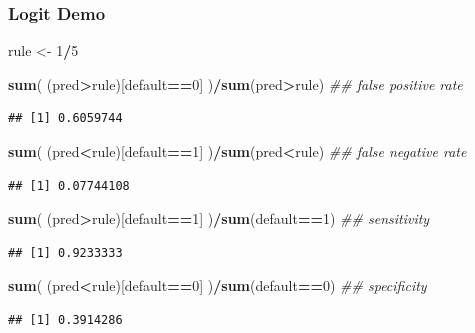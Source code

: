 \documentclass[
  shownotes,
  xcolor={svgnames},
  hyperref={colorlinks,citecolor=DarkBlue,linkcolor=DarkRed,urlcolor=DarkBlue}
  , aspectratio=169]{beamer}
\newenvironment{Shaded}{\begin{snugshade}}{\end{snugshade}}
\newcommand{\CommentTok}[1]{\textcolor[rgb]{0.56,0.35,0.01}{\textit{#1}}}
\newcommand{\DecValTok}[1]{\textcolor[rgb]{0.00,0.00,0.81}{#1}}
\newcommand{\KeywordTok}[1]{\textcolor[rgb]{0.13,0.29,0.53}{\textbf{#1}}}
\newcommand{\NormalTok}[1]{#1}
\newcommand{\OperatorTok}[1]{\textcolor[rgb]{0.81,0.36,0.00}{\textbf{#1}}}
\newcommand{\StringTok}[1]{\textcolor[rgb]{0.31,0.60,0.02}{#1}}
\begin{document}
\begin{frame}[fragile]
\frametitle{Logit Demo}

\begin{Shaded}
\begin{Highlighting}[]
\NormalTok{rule \textless{}{-}}\StringTok{ }\DecValTok{1}\OperatorTok{/}\DecValTok{5} 

\KeywordTok{sum}\NormalTok{( (pred}\OperatorTok{\textgreater{}}\NormalTok{rule)[default}\OperatorTok{==}\DecValTok{0}\NormalTok{] )}\OperatorTok{/}\KeywordTok{sum}\NormalTok{(pred}\OperatorTok{\textgreater{}}\NormalTok{rule) }\CommentTok{\#\# false positive rate}
\end{Highlighting}
\end{Shaded}

\begin{verbatim}
## [1] 0.6059744
\end{verbatim}

\begin{Shaded}
\begin{Highlighting}[]
\KeywordTok{sum}\NormalTok{( (pred}\OperatorTok{\textless{}}\NormalTok{rule)[default}\OperatorTok{==}\DecValTok{1}\NormalTok{] )}\OperatorTok{/}\KeywordTok{sum}\NormalTok{(pred}\OperatorTok{\textless{}}\NormalTok{rule) }\CommentTok{\#\# false negative rate}
\end{Highlighting}
\end{Shaded}

\begin{verbatim}
## [1] 0.07744108
\end{verbatim}

\begin{Shaded}
\begin{Highlighting}[]
\KeywordTok{sum}\NormalTok{( (pred}\OperatorTok{\textgreater{}}\NormalTok{rule)[default}\OperatorTok{==}\DecValTok{1}\NormalTok{] )}\OperatorTok{/}\KeywordTok{sum}\NormalTok{(default}\OperatorTok{==}\DecValTok{1}\NormalTok{) }\CommentTok{\#\# sensitivity}
\end{Highlighting}
\end{Shaded}

\begin{verbatim}
## [1] 0.9233333
\end{verbatim}

\begin{Shaded}
\begin{Highlighting}[]
\KeywordTok{sum}\NormalTok{( (pred}\OperatorTok{\textless{}}\NormalTok{rule)[default}\OperatorTok{==}\DecValTok{0}\NormalTok{] )}\OperatorTok{/}\KeywordTok{sum}\NormalTok{(default}\OperatorTok{==}\DecValTok{0}\NormalTok{) }\CommentTok{\#\# specificity}
\end{Highlighting}
\end{Shaded}

\begin{verbatim}
## [1] 0.3914286
\end{verbatim}

\end{frame}
\end{document}
